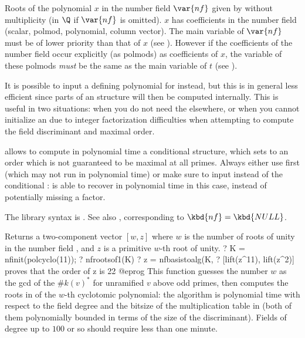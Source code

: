 \label{se:nfroots}
Roots of the polynomial $x$ in the
number field $\var{nf}$ given by  without multiplicity (in $\Q$
if $\var{nf}$ is omitted). $x$ has coefficients in the number field (scalar,
polmod, polynomial, column vector). The main variable of $\var{nf}$ must be
of lower priority than that of $x$ (see ). However if the
coefficients of the number field occur explicitly (as polmods) as
coefficients of $x$, the variable of these polmods \emph{must} be the same as
the main variable of $t$ (see ).

It is possible to input a defining polynomial for 
instead, but this is in general less efficient since parts of an 
structure will then be computed internally. This is useful in two
situations: when you do not need the  elsewhere, or when you cannot
initialize an  due to integer factorization difficulties when
attempting to compute the field discriminant and maximal order.

  allows to compute in polynomial
time a conditional  structure, which sets  to an order
which is not guaranteed to be maximal at all primes. Always either use
 first (which may not run in polynomial time) or make sure
to input  instead of the conditional :  is
able to recover in polynomial time in this case, instead of potentially
missing a factor.

The library syntax is .
See also ,
corresponding to $\kbd{nf} = \kbd{NULL}$.

\label{se:nfrootsof1}
Returns a two-component vector $[w,z]$ where $w$ is the number of roots of
unity in the number field , and $z$ is a primitive $w$-th root
of unity.
\bprog
? K = nfinit(polcyclo(11));
? nfrootsof1(K)
? z = nfbasistoalg(K, %
? [lift(z^11), lift(z^2)]     \\ proves that the order of z is 22
@eprog
This function guesses the number $w$ as the gcd of the $\#k(v)^*$ for
unramified $v$ above odd primes, then computes the roots in 
of the $w$-th cyclotomic polynomial: the algorithm is polynomial time with
respect to the field degree and the bitsize of the multiplication table in
 (both of them polynomially bounded in terms of the size of the
discriminant). Fields of degree up to $100$ or so should require less than
one minute.

